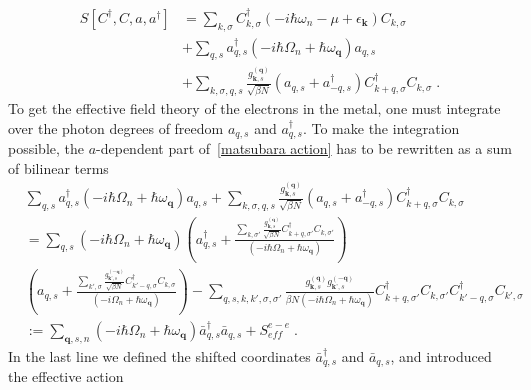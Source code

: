 \documentclass{article}
\begin{document}
\begin{align}
    S[C^{\dagger},C,a,a^{\dagger}] &= \sum_{k,\sigma} C^{\dagger}_{k,\sigma}\left(-i\hbar\omega_n - \mu + \epsilon_{\textbf{k}}\right) C_{k,\sigma} \nonumber \\
                                   &+ \sum_{q,s} a^{\dagger}_{q,s} \left(-i\hbar \Omega_n + \hbar \omega_{\textbf{q}}\right) a_{q,s} \label{matsubara action} \\
                                   &+ \sum_{k,\sigma,q,s} \frac{g_{\textbf{k},s}^{(\textbf{q})}}{\sqrt{\beta N}} \left(a_{q,s} + a_{-q, s}^{\dagger}\right) C^{\dagger}_{k + q,\sigma}C_{k,\sigma}\;.\nonumber
\end{align}
To get the effective field theory of the electrons in the metal, one must integrate over the photon degrees of freedom $a_{q,s}$ and $a_{q,s}^{\dagger}$. To make the integration possible, the $a$-dependent part of~\cref{matsubara action} has to be rewritten as a sum of bilinear terms
\begin{align}
     &\sum_{q,s} a^{\dagger}_{q,s} \left(-i\hbar\Omega_n + \hbar \omega_{\textbf{q}}\right) a_{q,s} + \sum_{k,\sigma,q,s} \frac{g_{\textbf{k},s}^{(\textbf{q})}}{\sqrt{\beta N}} \left(a_{q,s} + a_{-q, s}^{\dagger}\right) C^{\dagger}_{k + q,\sigma}C_{k,\sigma}\nonumber \\
     &= \sum_{q,s} \left(-i\hbar\Omega_n + \hbar \omega_{\textbf{q}}\right)  \left(a^{\dagger}_{q,s} + \frac{\sum_{k,\sigma'} \frac{g_{\textbf{k},s}^{(\textbf{q})}}{\sqrt{\beta N}} C^{\dagger}_{k + q,\sigma'}C_{k,\sigma'} }{\left(-i\hbar\Omega_n + \hbar \omega_{\textbf{q}}\right)} \right) \label{rewriting action}\\
     & \left(a_{q,s} + \frac{\sum_{k',\sigma} \frac{g_{\textbf{k'},s}^{(-\textbf{q})}}{\sqrt{\beta N}} C^{\dagger}_{k' - q,\sigma}C_{k,\sigma} }{\left(-i\Omega_{n} + \hbar \omega_{\textbf{q}}\right)}\right)
     -\sum_{q,s,k,k',\sigma,\sigma'} \frac{g_{\textbf{k},s}^{(\textbf{q})} g_{\textbf{k'},s}^{(-\textbf{q})}  }{\beta N\left(-i\hbar\Omega_n + \hbar \omega_{\textbf{q}}\right)}
      C^{\dagger}_{k + q,\sigma'}C_{k,\sigma'} C^{\dagger}_{k' - q,\sigma}C_{k',\sigma}\nonumber \\
     &:= \sum_{\textbf{q},s,n} \left(-i\hbar\Omega_n + \hbar \omega_{\textbf{q}}\right)  \bar{a}^{\dagger}_{q,s}\bar{a}_{q,s} + S^{e-e}_{eff}\;.\nonumber
\end{align}
In the last line we defined the shifted coordinates  $\bar{a}^{\dagger}_{q,s}$ and $\bar{a}_{q,s}$, and introduced the effective action
\end{document}
